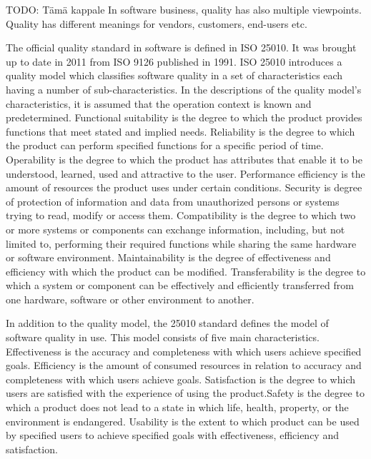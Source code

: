 TODO: Tämä kappale
In software business, quality has also multiple viewpoints. Quality has different meanings for vendors, customers, end-users etc. 




 
The official quality standard in software is defined in ISO 25010. It was brought up to date in 2011 from ISO 9126 published in 1991. ISO 25010 introduces a quality model which classifies software quality in a set of characteristics each having a number of sub-characteristics. In the descriptions of the quality model's characteristics, it is assumed that the operation context is known and predetermined. Functional suitability is the degree to which the product provides functions that meet stated and implied needs. Reliability is the degree to which the product can perform specified functions for a specific period of time. Operability is the degree to which the product has attributes that enable it to be understood, learned, used and attractive to the user. Performance efficiency is the amount of resources the product uses under certain conditions. Security is degree of protection of information and data from unauthorized persons or systems trying to read, modify or access them. Compatibility is the degree to which two or more systems or components can exchange information, including, but not limited to, performing their required functions while sharing the same hardware or software environment. Maintainability is the degree of effectiveness and efficiency with which the product can be modified.  Transferability is the degree to which a system or component can be effectively and efficiently transferred from one hardware, software or other environment to another.

In addition to the quality model, the 25010 standard defines the model of software quality in use. This model consists of five main characteristics. Effectiveness is the accuracy and completeness with which users achieve specified goals. Efficiency is the amount of consumed resources in relation to accuracy and completeness with which users achieve goals. Satisfaction is the degree to which users are satisfied with the experience of using the product.Safety is the degree to which a product does not lead to a state in which life, health, property, or the environment is endangered. Usability is the extent to which product can be used by specified users to achieve specified goals with effectiveness, efficiency and satisfaction.~\cite{ISOBlog}





 
 
 